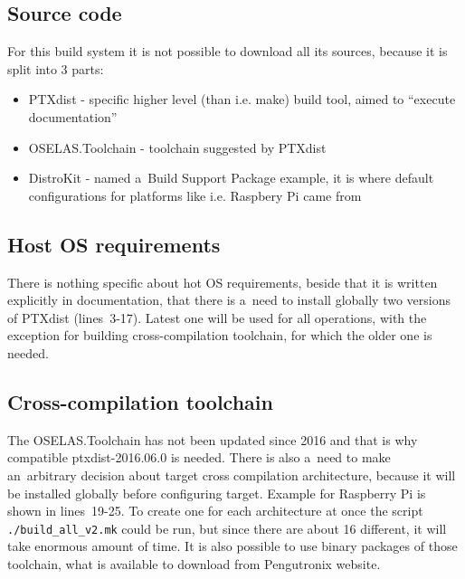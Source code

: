 \documentclass[printmode]{mgr}
\begin{document}



\subsection*{Source code}

For this build system it is not possible to download all its sources, because it is split into 3 parts:

\begin{itemize}
    \itemsep0em
    \item PTXdist - specific higher level (than i.e. make) build tool, aimed to ``execute documentation''
    \item OSELAS.Toolchain - toolchain suggested by PTXdist
    \item DistroKit - named a~Build Support Package example, it is where default configurations for platforms like i.e. Raspbery Pi came from
\end{itemize}

\subsection*{Host OS requirements}

There is nothing specific about hot OS requirements, beside that it is written explicitly in documentation, that there is a~need to install globally two versions of PTXdist (lines~3-17).
Latest one will be used for all operations, with the exception for building cross-compilation toolchain, for which the older one is needed.

\subsection*{Cross-compilation toolchain}

The OSELAS.Toolchain has not been updated since 2016 and that is why compatible ptxdist-2016.06.0 is needed.
There is also a~need to make an~arbitrary decision about target cross compilation architecture, because it will be installed globally before configuring target.
Example for Raspberry Pi is shown in lines~19-25.
To create one for each architecture at once the script \verb|./build_all_v2.mk| could be run, but since there are about 16 different, it will take enormous amount of time.
It is also possible to use binary packages of those toolchain, what is available to download from Pengutronix website.
\end{document}

